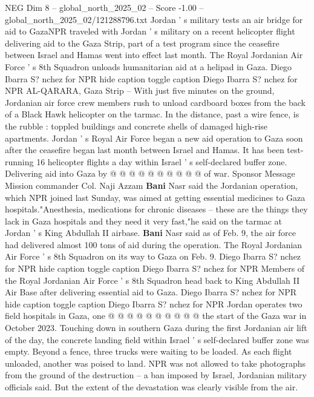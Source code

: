 \begin{textsample}{NEG Dim 8 – global\_north\_2025\_02 – Score -1.00 – global\_north\_2025\_02/121288796.txt}  \label{ex:f8_neg_147}
Jordan ' s military tests an air bridge for aid to GazaNPR traveled with Jordan ' s military on a recent helicopter flight delivering aid to the Gaza Strip, part of a test program since the ceasefire between Israel and Hamas went into effect last month.
The Royal Jordanian Air Force ' s 8th Squadron unloads humanitarian aid at a helipad in Gaza.
Diego Ibarra S? nchez for NPR hide caption toggle caption Diego Ibarra S? nchez for NPR AL-QARARA, Gaza Strip -- With just five minutes on the ground, Jordanian air force crew members rush to unload cardboard boxes from the back of a Black Hawk helicopter on the tarmac.
In the distance, past a wire fence, is the rubble : toppled buildings and concrete shells of damaged high-rise apartments.
Jordan ' s Royal Air Force began a new aid operation to Gaza soon after the ceasefire began last month between Israel and Hamas.
It has been test-running 16 helicopter flights a day within Israel ' s self-declared buffer zone.
Delivering aid into Gaza by @ @ @ @ @ @ @ @ @ @ of war.
Sponsor Message Mission commander Col.
Naji Azzam \textbf{Bani} Nasr said the Jordanian operation, which NPR joined last Sunday, was aimed at getting essential medicines to Gaza hospitals."Anesthesia, medications for chronic diseases -- these are the things they lack in Gaza hospitals and they need it very fast,"he said on the tarmac at Jordan ' s King Abdullah II airbase. \textbf{Bani} Nasr said as of Feb. 9, the air force had delivered almost 100 tons of aid during the operation.
The Royal Jordanian Air Force ' s 8th Squadron on its way to Gaza on Feb. 9.
Diego Ibarra S? nchez for NPR hide caption toggle caption Diego Ibarra S? nchez for NPR Members of the Royal Jordanian Air Force ' s 8th Squadron head back to King Abdullah II Air Base after delivering essential aid to Gaza.
Diego Ibarra S? nchez for NPR hide caption toggle caption Diego Ibarra S? nchez for NPR Jordan operates two field hospitals in Gaza, one @ @ @ @ @ @ @ @ @ @ the start of the Gaza war in October 2023.
Touching down in southern Gaza during the first Jordanian air lift of the day, the concrete landing field within Israel ' s self-declared buffer zone was empty.
Beyond a fence, three trucks were waiting to be loaded.
As each flight unloaded, another was poised to land.
NPR was not allowed to take photographs from the ground of the destruction -- a ban imposed by Israel, Jordanian military officials said.
But the extent of the devastation was clearly visible from the air.

\end{textsample}
